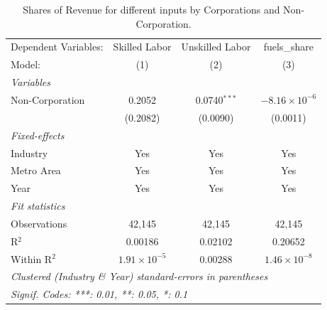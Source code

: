 \documentclass[
  12pt]{article}
\theoremstyle{definition}
\theoremstyle{remark}
\begin{document}
\begin{table}

\caption{\label{tbl-reg-shares-2}Shares of Revenue for different inputs
by Corporations and Non-Corporation.}

\begin{minipage}{\linewidth}

\begingroup
\centering
\begin{tabular}{lccc}
   \tabularnewline \midrule \midrule
   Dependent Variables: & Skilled Labor         & Unskilled Labor & fuels\_share\\   
   Model:               & (1)                   & (2)             & (3)\\  
   \midrule
   \emph{Variables}\\
   Non-Corporation      & 0.2052                & 0.0740$^{***}$  & $-8.16\times 10^{-6}$\\    
                        & (0.2082)              & (0.0090)        & (0.0011)\\   
   \midrule
   \emph{Fixed-effects}\\
   Industry             & Yes                   & Yes             & Yes\\  
   Metro Area           & Yes                   & Yes             & Yes\\  
   Year                 & Yes                   & Yes             & Yes\\  
   \midrule
   \emph{Fit statistics}\\
   Observations         & 42,145                & 42,145          & 42,145\\  
   R$^2$                & 0.00186               & 0.02102         & 0.20652\\  
   Within R$^2$         & $1.91\times 10^{-5}$  & 0.00288         & $1.46\times 10^{-8}$\\   
   \midrule \midrule
   \multicolumn{4}{l}{\emph{Clustered (Industry \& Year) standard-errors in parentheses}}\\
   \multicolumn{4}{l}{\emph{Signif. Codes: ***: 0.01, **: 0.05, *: 0.1}}\\
\end{tabular}
\par\endgroup

\end{minipage}%

\end{table}%
\end{document}
